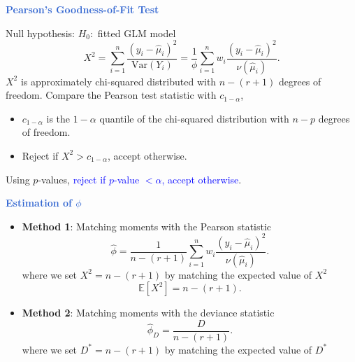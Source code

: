 \documentclass[aspectratio=169,professionalfonts,mathserif]{beamer}
\newcommand{\highlight}[1]{\textcolor{Highlight}{\bf #1}}
\renewcommand{\(}{\left(}
\renewcommand{\)}{\right)}
\renewcommand{\[}{\left[}
\renewcommand{\]}{\right]}
\newcommand{\mytitle}[1]{\vspace*{-1mm}%
  \centerline{\highlight{\Large #1}}\vspace*{3mm}}
\newenvironment{slidebox}{%
  \begin{minipage}[c][7.5cm][t]{14.4cm}\raggedright}{%
  \end{minipage}}
\begin{document}
\begin{frame}\begin{slidebox}
  \mytitle{Pearson's Goodness-of-Fit Test}
  Null hypothesis: $H_0:$ fitted GLM model
  \begin{equation*}
    X^2 = \sum_{i=1}^n \frac{(y_i - \hat{\mu}_i)^2}{\text{Var}(Y_i)} = \frac{1}{\phi} \sum_{i=1}^n w_i \frac{(y_i - \hat{\mu}_i)^2}{\nu(\hat{\mu}_i)} \text{.} 
  \end{equation*}
  $X^2$ is approximately chi-squared distributed with $n - (r+1)$ degrees of freedom.
  \pause
  Compare the Pearson test statistic with $c_{1-\alpha}$, 
  \begin{itemize}
    \item  $c_{1-\alpha}$ is the $1-\alpha$ quantile of the chi-squared distribution with $n-p$ degrees of freedom.
    \item  Reject if $X^2 > c_{1-\alpha}$, accept otherwise.
  \end{itemize}
  \pause
  Using $p$-values, \textcolor{blue}{reject if $p$-value $< \alpha$, accept otherwise}.

\end{slidebox}\end{frame}

\begin{frame}\begin{slidebox}
  \mytitle{Estimation of $\phi$}
  \begin{itemize}
    \item \textbf{Method 1}: Matching moments with the Pearson statistic
    \begin{equation*}
      \hat{\phi} = \frac{1}{n-(r+1)} \sum_{i=1}^n w_i \frac{(y_i - \hat{\mu}_i)^2}{\nu(\hat{\mu}_i)} \text{.} 
    \end{equation*}
    where we set $X^2 = n - (r+1)$ by matching the expected value of $X^2$
    \begin{equation*}
      \mathbb{E}[X^2] = n - (r+1) \text{.}
    \end{equation*}
    \pause
    \item \textbf{Method 2}: Matching moments with the deviance statistic
    \begin{equation*}
      \hat{\phi}_D = \frac{D}{n-(r+1)} \text{.}
    \end{equation*}
    where we set $D^* = n - (r+1)$ by matching the expected value of $D^*$
  \end{itemize}
\end{slidebox}\end{frame}
\end{document}
